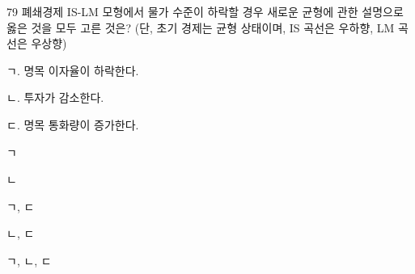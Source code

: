 \begin{question}{79}
폐쇄경제 IS-LM 모형에서 물가 수준이 하락할 경우 새로운 균형에 관한 설명으로 옳은 것을 모두 고른 것은? (단, 초기 경제는 균형 상태이며, IS 곡선은 우하향, LM 곡선은 우상향)
\begin{framedtext}
ㄱ. 명목 이자율이 하락한다. \par
ㄴ. 투자가 감소한다. \par
ㄷ. 명목 통화량이 증가한다. \par
\end{framedtext}
\begin{choices}
  \item ㄱ
  \item ㄴ
  \item ㄱ, ㄷ
  \item ㄴ, ㄷ
  \item ㄱ, ㄴ, ㄷ
\end{choices}
\end{question}
